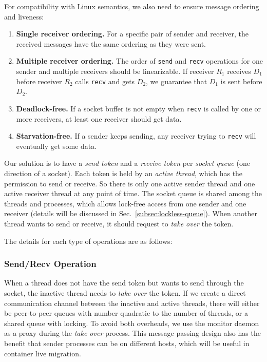 For compatibility with Linux semantics, we also need to ensure message ordering and liveness:
\begin{enumerate}
\item \textbf{Single receiver ordering.} For a specific pair of sender and receiver, the received messages have the same ordering as they were sent.
\item \textbf{Multiple receiver ordering.} The order of \texttt{send} and \texttt{recv} operations for one sender and multiple receivers should be linearizable. If receiver $R_1$ receives $D_1$ before receiver $R_2$ calls \texttt{recv} and gets $D_2$, we guarantee that $D_1$ is sent before $D_2$.
\item \textbf{Deadlock-free.} If a socket buffer is not empty when \texttt{recv} is called by one or more receivers, at least one receiver should get data.
\item \textbf{Starvation-free.} If a sender keeps sending, any receiver trying to \texttt{recv} will eventually get some data.
\end{enumerate}
\fi

Our solution is to have a \emph{send token} and a \emph{receive token} per \emph{socket queue} (one direction of a socket).
Each token is held by an \emph{active thread}, which has the permission to send or receive.
So there is only one active sender thread and one active receiver thread at any point of time.
The socket queue is shared among the threads and processes, which allows lock-free access from one sender and one receiver (details will be discussed in Sec.~\ref{subsec:lockless-queue}).
When another thread wants to send or receive, it should request to \emph{take over} the token.


The details for each type of operations are as follows: %

\subsubsection{Send/Recv Operation}
\label{subsubsec:fork_rdwr}
\quad

When a thread does not have the send token but wants to send through the socket, the inactive thread needs to \emph{take over} the token.
If we create a direct communication channel between the inactive and active threads, there will either be peer-to-peer queues with number quadratic to the number of threads, or a shared queue with locking.
To avoid both overheads, we use the monitor daemon as a proxy during the \emph{take over} process.
This message passing design also has the benefit that sender processes can be on different hosts, which will be useful in container live migration.

